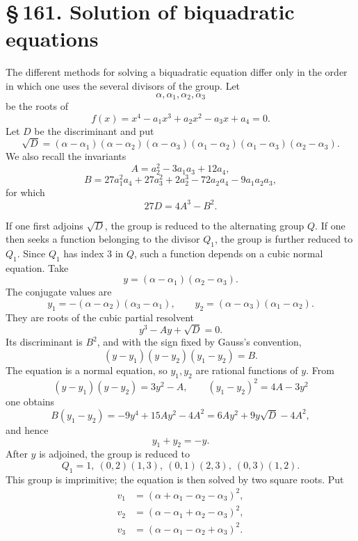 \documentclass[11pt]{article}
\providecommand{\sect}[2]{\section*{\S\,#1. #2}}
\begin{document}
\sect{161}{Solution of biquadratic equations}

The different methods for solving a biquadratic equation differ only in the order in which one uses the several divisors of the group. Let
\[
        \alpha,\alpha_1,\alpha_2,\alpha_3
\]
be the roots of
\[
        f(x)=x^4-a_1x^3+a_2x^2-a_3x+a_4=0.        \tag{1}
\]
Let $D$ be the discriminant and put
\[
 \sqrt D=(\alpha-\alpha_1)(\alpha-\alpha_2)(\alpha-\alpha_3)
(\alpha_1-\alpha_2)(\alpha_1-\alpha_3)(\alpha_2-\alpha_3).        \tag{2}
\]
We also recall the invariants
\[
        A=a_2^2-3a_1a_3+12a_4,                                      \tag{3}
\]
\[
        B=27a_1^2a_4+27a_3^2+2a_2^3-72a_2a_4-9a_1a_2a_3,              \tag{4}
\]
for which
\[
        27D=4A^3-B^2.                                                  \tag{5}
\]

If one first adjoins $\sqrt D$, the group is reduced to the alternating group $Q$. If one then seeks a function belonging to the divisor $Q_1$, the group is further reduced to $Q_1$. Since $Q_1$ has index $3$ in $Q$, such a function depends on a cubic normal equation. Take
\[
        y=(\alpha-\alpha_1)(\alpha_2-\alpha_3).                       \tag{6}
\]
The conjugate values are
\[
        y_1=-(\alpha-\alpha_2)(\alpha_3-\alpha_1),\qquad
        y_2=(\alpha-\alpha_3)(\alpha_1-\alpha_2).                     \tag{7}
\]
They are roots of the cubic partial resolvent
\[
        y^3-Ay+\sqrt D=0.                                              \tag{8}
\]
Its discriminant is $B^2$, and with the sign fixed by Gauss's convention,
\[
        (y-y_1)(y-y_2)(y_1-y_2)=B.                                     \tag{9}
\]
The equation is a normal equation, so $y_1,y_2$ are rational functions of $y$. From
\[
 (y-y_1)(y-y_2)=3y^2-A,
 \qquad
 (y_1-y_2)^2=4A-3y^2
\]
one obtains
\[
        B(y_1-y_2)=-9y^4+15Ay^2-4A^2=6Ay^2+9y\sqrt D-4A^2,
\]
and hence
\[
        y_1+y_2=-y.                                                    \tag{10}
\]
After $y$ is adjoined, the group is reduced to
\[
        Q_1=1,\ (0,2)(1,3),\ (0,1)(2,3),\ (0,3)(1,2).
\]
This group is imprimitive; the equation is then solved by two square roots. Put
\[
\begin{aligned}
        v_1&=(\alpha+\alpha_1-\alpha_2-\alpha_3)^2,\\
        v_2&=(\alpha-\alpha_1+\alpha_2-\alpha_3)^2,\\
        v_3&=(\alpha-\alpha_1-\alpha_2+\alpha_3)^2.
\end{aligned}                                                          \tag{11}
\]
\end{document}
